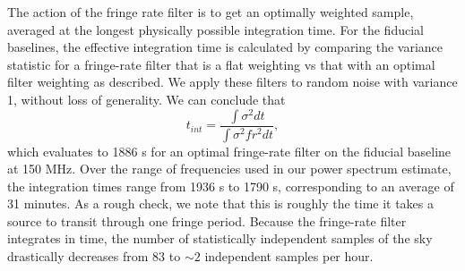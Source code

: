 \documentclass[twocolumn,numberedappendix]{emulateapj} \shorttitle{PSA64}
\begin{document}
The action of the fringe rate filter is to get an optimally weighted
sample, averaged at the longest physically possible integration time.  For the
fiducial baselines, the effective
integration time is calculated by comparing the variance statistic for a
fringe-rate filter that is a flat weighting vs that with an optimal filter
weighting as described. We apply these filters to random noise with variance 1,
without loss of generality. We can conclude that 
\begin{equation}
    t_{int} = \frac{\int{\sigma^{2}dt}}{\int{\sigma^{2}fr^{2}dt}},
\end{equation}
which evaluates to 1886 s for an optimal fringe-rate filter on the fiducial 
baseline at 150 MHz.  Over the range of frequencies used in our power spectrum
estimate, the integration times range from 1936 s to 1790 s, corresponding to an
average of 31 minutes. As a rough check, we note that this is roughly the time
it takes a source to transit through one fringe period.
Because
the fringe-rate filter integrates in time, the number of statistically
independent samples of the sky drastically decreases from 83 to $\sim2$
independent samples per hour.

%

\end{document}
